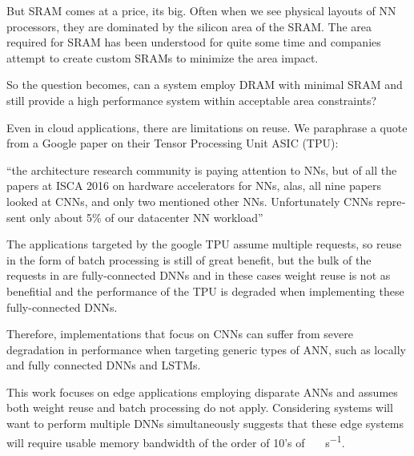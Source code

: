 But SRAM comes at a price, its big. Often when we see physical layouts of NN processors, they are dominated by the silicon area of the SRAM. The area required for SRAM has been understood for quite some time and companies attempt to create custom SRAMs to minimize the area impact.

So the question becomes, can a system employ DRAM with minimal SRAM and still provide a high performance system within acceptable area constraints?

\iffalse
We believe a system can be designed with DRAM as the primary processing store. This will require careful use of data structures to describe storage within DRAM to ensure we make good use of the potential bandwidth. But there are other benefits we will take advantage of, but more about that later.
\fi

\iffalse
There important application is disparate ANNs because specifically a form of DNN, Convolutional Neural networks (CNN) have gotten good press recently, but they are not the only DNN.
\fi

Even in cloud applications, there are limitations on reuse. We paraphrase a quote from a Google paper \cite{tensorflow2015-whitepaper} on their Tensor Processing Unit ASIC (TPU):

\hyphenquote{american}{the architecture research community is paying attention to NNs, but of all the papers at ISCA 2016 on hardware accelerators for NNs, alas, all nine papers looked at CNNs, and only two mentioned other NNs. Unfortunately CNNs represent only about 5\% of our datacenter NN workload}

The applications targeted by the google TPU \cite{tensorflow2015-whitepaper} assume multiple requests, so reuse in the form of batch processing is still of great benefit, but the bulk of the requests in \cite{tensorflow2015-whitepaper} are fully-connected DNNs and in these cases weight reuse is not as benefitial and the performance of the TPU is degraded when implementing these fully-connected DNNs.

Therefore, implementations that focus on CNNs can suffer from severe degradation in performance when targeting generic types of ANN, such as locally and fully connected DNNs and LSTMs.

This work focuses on edge applications employing disparate ANNs and assumes both weight reuse and batch processing do not apply.
Considering systems will want to perform multiple DNNs simultaneously suggests that these edge systems will require usable memory bandwidth of the order of 10's of \SI[per-mode=symbol]{}{\tera \bit \per \second}.

